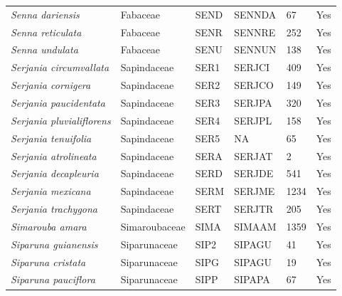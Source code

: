 \documentclass[11pt]{article}
\begin{document}
\begin{longtable}{@{}llllll@{}}
\textit{Senna dariensis}                              & Fabaceae         & SEND   & SENNDA & 67              & Yes       \\
\textit{Senna reticulata}                             & Fabaceae         & SENR   & SENNRE & 252             & Yes       \\
\textit{Senna undulata}                               & Fabaceae         & SENU   & SENNUN & 138             & Yes       \\
\textit{Serjania circumvallata}                       & Sapindaceae      & SER1   & SERJCI & 409             & Yes       \\
\textit{Serjania cornigera}                           & Sapindaceae      & SER2   & SERJCO & 149             & Yes       \\
\textit{Serjania paucidentata}                        & Sapindaceae      & SER3   & SERJPA & 320             & Yes       \\
\textit{Serjania pluvialiflorens}                     & Sapindaceae      & SER4   & SERJPL & 158             & Yes       \\
\textit{Serjania tenuifolia}                          & Sapindaceae      & SER5   & NA     & 65              & Yes       \\
\textit{Serjania atrolineata}                         & Sapindaceae      & SERA   & SERJAT & 2               & Yes       \\
\textit{Serjania decapleuria}                         & Sapindaceae      & SERD   & SERJDE & 541             & Yes       \\
\textit{Serjania mexicana}                            & Sapindaceae      & SERM   & SERJME & 1234            & Yes       \\
\textit{Serjania trachygona}                          & Sapindaceae      & SERT   & SERJTR & 205             & Yes       \\
\textit{Simarouba amara}                              & Simaroubaceae    & SIMA   & SIMAAM & 1359            & Yes       \\
\textit{Siparuna guianensis}                          & Siparunaceae     & SIP2   & SIPAGU & 41              & Yes       \\
\textit{Siparuna cristata}                            & Siparunaceae     & SIPG   & SIPAGU & 19              & Yes       \\
\textit{Siparuna pauciflora}                          & Siparunaceae     & SIPP   & SIPAPA & 67              & Yes       \\

\end{longtable}
\end{document}
